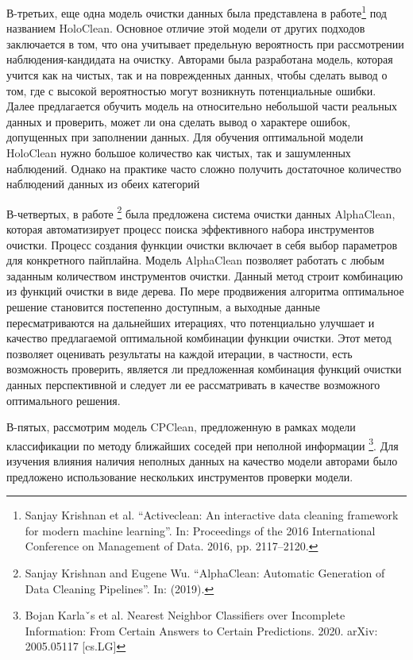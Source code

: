 \documentclass[12pt,a4paper, oneside]{extreport}
\begin{document}
В-третьих, еще одна модель  очистки данных  была представлена в работе\footnote{Sanjay Krishnan et al. “Activeclean: An interactive data cleaning framework for modern machine 	learning”. In: Proceedings of the 2016 International Conference on Management of Data. 2016,	pp. 2117–2120.} под названием HoloClean. Основное отличие  этой модели  от других подходов заключается в том, что она учитывает предельную вероятность при рассмотрении наблюдения-кандидата на очистку. 
Авторами была  разработана  модель, которая учится как на чистых, так и на поврежденных данных, чтобы сделать вывод о том, где с высокой вероятностью могут возникнуть потенциальные ошибки. Далее предлагается обучить модель на относительно небольшой части реальных данных и проверить, может ли она сделать вывод о характере ошибок, допущенных при заполнении данных. Для обучения оптимальной модели HoloClean нужно большое количество как чистых, так и зашумленных наблюдений. Однако на практике часто сложно получить достаточное количество наблюдений данных из обеих категорий

В-четвертых, в работе \footnote{Sanjay Krishnan and Eugene Wu. “AlphaClean: Automatic Generation of Data Cleaning Pipelines”. In: (2019).}  была предложена система очистки данных AlphaClean, которая автоматизирует процесс поиска эффективного набора  инструментов очистки. Процесс создания функции очистки включает в себя выбор параметров для конкретного пайплайна. Модель AlphaClean позволяет  работать  с любым заданным количеством инструментов очистки. Данный метод строит комбинацию из функций очистки  в виде дерева. По мере продвижения алгоритма оптимальное решение становится постепенно доступным, а выходные данные пересматриваются на  дальнейших итерациях, что потенциально улучшает и  качество предлагаемой оптимальной комбинации функции очистки. Этот метод позволяет  оценивать результаты на каждой итерации, в частности, есть возможность  проверить, является ли предложенная комбинация функций очистки данных перспективной и следует ли ее рассматривать в качестве возможного оптимального решения. 

В-пятых, рассмотрим модель  CPClean, предложенную   в рамках модели классификации по методу  ближайших соседей при неполной информации \footnote{Bojan Karlaˇs et al. Nearest Neighbor Classifiers over Incomplete Information: From Certain 	Answers to Certain Predictions. 2020. arXiv: 2005.05117 [cs.LG]}.  Для изучения влияния наличия неполных данных на качество модели авторами было  предложено использование нескольких инструментов  проверки модели. 
\end{document}
